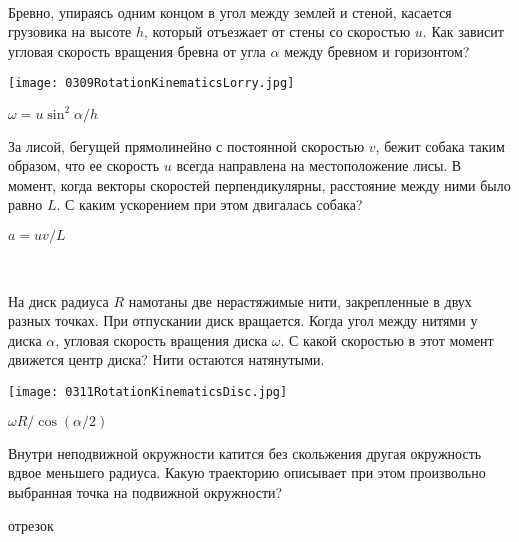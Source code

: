 \begin{ex}
\hspace{0pt} \\
\begin{minipage}{.65\textwidth}
Бревно, упираясь одним концом в угол между землей и стеной, касается грузовика на высоте $h$, который отъезжает от стены со скоростью $u$. Как зависит угловая скорость вращения бревна от угла $\alpha$ между бревном и горизонтом?
\end{minipage}
\begin{minipage}{.35\textwidth}
\centering
\texttt{[image: 0309RotationKinematicsLorry.jpg]}
\end{minipage}
\begin{ans}
$\omega = u \sin^2 \alpha /h$
\end{ans}
\end{ex}

\begin{ex}
За лисой, бегущей прямолинейно с постоянной скоростью $v$, бежит собака таким образом, что ее скорость $u$ всегда направлена на местоположение лисы. В момент, когда векторы скоростей перпендикулярны, расстояние между ними было равно $L$. С каким ускорением при этом двигалась собака?
\begin{ans}
$a = uv/L$
\end{ans}
\end{ex}

\begin{ex} 
\hspace{0pt} \\
\begin{minipage}{.65\textwidth}
На диск радиуса $R$ намотаны две нерастяжимые нити, закрепленные в двух разных точках. При отпускании диск вращается. Когда угол между нитями у диска $\alpha$, угловая скорость вращения диска $\omega$. С какой скоростью в этот момент движется центр диска? Нити остаются натянутыми.
\end{minipage}
\begin{minipage}{.35\textwidth}
\centering
\texttt{[image: 0311RotationKinematicsDisc.jpg]}
\end{minipage}
\begin{ans}
$\omega R/ \cos (\alpha /2)$
\end{ans}
\end{ex}

\begin{ex}
Внутри неподвижной окружности катится без скольжения другая окружность вдвое меньшего радиуса. Какую траекторию описывает при этом произвольно выбранная точка на подвижной окружности?
\begin{ans}
отрезок
\end{ans}
\end{ex}

